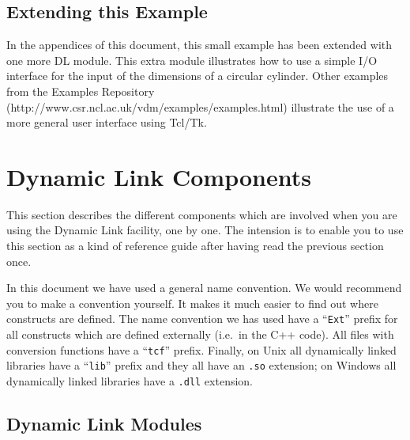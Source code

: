 \documentclass[\pformat,12pt]{article}
\begin{document}
\subsection*{Extending this Example}

In the appendices of this document, this small example has been
extended with one more DL module. This extra module illustrates how to
use a simple I/O interface for the input of the dimensions of a
circular cylinder. Other examples from the Examples Repository
(http://www.csr.ncl.ac.uk/vdm/examples/examples.html)
illustrate the use of a more general user interface using Tcl/Tk.
 
\section{Dynamic Link Components}
\label{sec:dlcomponents}

This section describes the different components which are involved
when you are using the Dynamic Link facility, one by one. The
intension is to enable you to use this section as a kind of reference
guide after having read the previous section once.

In this document we have used a general name convention. We would
recommend you to make a convention yourself. It makes it much easier
to find out where constructs are defined. The name convention we has
used have a ``{\tt Ext}'' prefix for all constructs which are defined
externally (i.e.\ in the C++ code). All files with conversion functions
have a ``{\tt tcf}'' prefix.  Finally, on Unix all dynamically linked libraries
have a ``{\tt lib}'' prefix and they all have an {\tt .so} extension;
on Windows all dynamically linked libraries have a \texttt{.dll}
extension. 

\subsection{Dynamic Link Modules}
\end{document}
